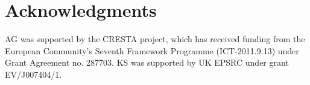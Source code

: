 

\section*{Acknowledgments}
AG was supported by the CRESTA project, which has received
funding from the European Community's Seventh Framework Programme
(ICT-2011.9.13) under Grant Agreement no. 287703. KS was supported
by UK EPSRC under grant EV/J007404/1.




%
%
%


